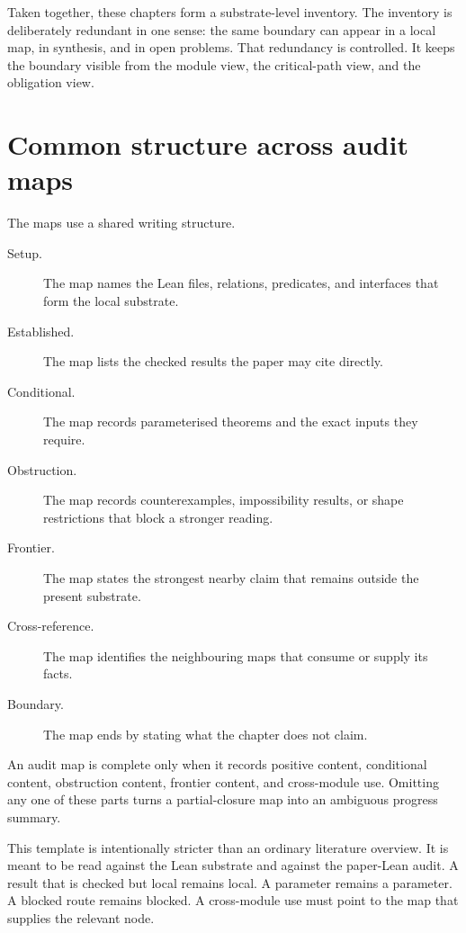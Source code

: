 Taken together, these chapters form a substrate-level inventory. The inventory
is deliberately redundant in one sense: the same boundary can appear in a local
map, in synthesis, and in open problems. That redundancy is controlled. It
keeps the boundary visible from the module view, the critical-path view, and
the obligation view.

\section{Common structure across audit maps}
\label{sec:audit-map-family-common-structure}

The maps use a shared writing structure.

\begin{description}
\item[Setup.] The map names the Lean files, relations, predicates, and
interfaces that form the local substrate.
\item[Established.] The map lists the checked results the paper may cite
directly.
\item[Conditional.] The map records parameterised theorems and the exact
inputs they require.
\item[Obstruction.] The map records counterexamples, impossibility results, or
shape restrictions that block a stronger reading.
\item[Frontier.] The map states the strongest nearby claim that remains
outside the present substrate.
\item[Cross-reference.] The map identifies the neighbouring maps that consume
or supply its facts.
\item[Boundary.] The map ends by stating what the chapter does not claim.
\end{description}

\begin{principle}
\label{prin:audit-map-family-template}
An audit map is complete only when it records positive content, conditional
content, obstruction content, frontier content, and cross-module use. Omitting
any one of these parts turns a partial-closure map into an ambiguous progress
summary.
\end{principle}

This template is intentionally stricter than an ordinary literature overview.
It is meant to be read against the Lean substrate and against the paper-Lean
audit. A result that is checked but local remains local. A parameter remains a
parameter. A blocked route remains blocked. A cross-module use must point to
the map that supplies the relevant node.


